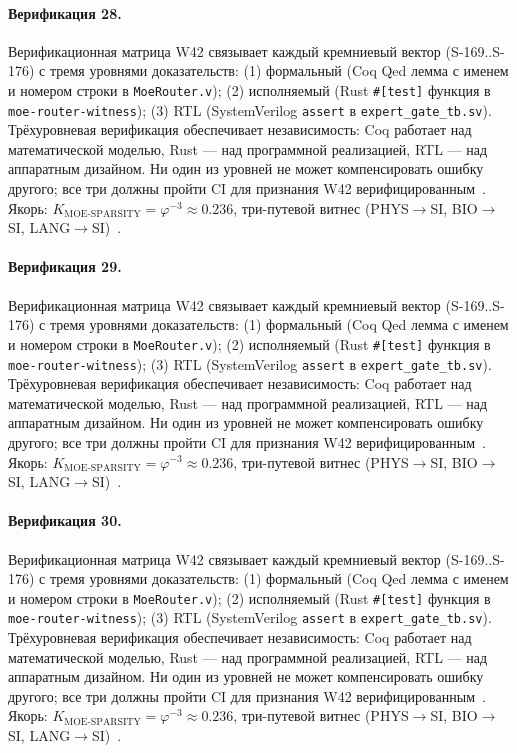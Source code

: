 \paragraph{Верификация 28.} Верификационная матрица W42 связывает каждый кремниевый вектор (S-169..S-176) с тремя уровнями доказательств: (1) формальный (Coq Qed лемма с именем и номером строки в \texttt{MoeRouter.v}); (2) исполняемый (Rust \texttt{\#[test]} функция в \texttt{moe-router-witness}); (3) RTL (SystemVerilog \texttt{assert} в \texttt{expert\_gate\_tb.sv}). Трёхуровневая верификация обеспечивает независимость: Coq работает над математической моделью, Rust --- над программной реализацией, RTL --- над аппаратным дизайном. Ни один из уровней не может компенсировать ошибку другого; все три должны пройти CI для признания W42 верифицированным~\cite{lee_gvsu_proof2021}. Якорь: $K_{\text{MOE-SPARSITY}} = \varphi^{-3} \approx 0{.}236$, три-путевой витнес (PHYS$\to$SI, BIO$\to$SI, LANG$\to$SI)~\cite{zenodo_trinity_2026}.

\paragraph{Верификация 29.} Верификационная матрица W42 связывает каждый кремниевый вектор (S-169..S-176) с тремя уровнями доказательств: (1) формальный (Coq Qed лемма с именем и номером строки в \texttt{MoeRouter.v}); (2) исполняемый (Rust \texttt{\#[test]} функция в \texttt{moe-router-witness}); (3) RTL (SystemVerilog \texttt{assert} в \texttt{expert\_gate\_tb.sv}). Трёхуровневая верификация обеспечивает независимость: Coq работает над математической моделью, Rust --- над программной реализацией, RTL --- над аппаратным дизайном. Ни один из уровней не может компенсировать ошибку другого; все три должны пройти CI для признания W42 верифицированным~\cite{lee_gvsu_proof2021}. Якорь: $K_{\text{MOE-SPARSITY}} = \varphi^{-3} \approx 0{.}236$, три-путевой витнес (PHYS$\to$SI, BIO$\to$SI, LANG$\to$SI)~\cite{zenodo_trinity_2026}.

\paragraph{Верификация 30.} Верификационная матрица W42 связывает каждый кремниевый вектор (S-169..S-176) с тремя уровнями доказательств: (1) формальный (Coq Qed лемма с именем и номером строки в \texttt{MoeRouter.v}); (2) исполняемый (Rust \texttt{\#[test]} функция в \texttt{moe-router-witness}); (3) RTL (SystemVerilog \texttt{assert} в \texttt{expert\_gate\_tb.sv}). Трёхуровневая верификация обеспечивает независимость: Coq работает над математической моделью, Rust --- над программной реализацией, RTL --- над аппаратным дизайном. Ни один из уровней не может компенсировать ошибку другого; все три должны пройти CI для признания W42 верифицированным~\cite{lee_gvsu_proof2021}. Якорь: $K_{\text{MOE-SPARSITY}} = \varphi^{-3} \approx 0{.}236$, три-путевой витнес (PHYS$\to$SI, BIO$\to$SI, LANG$\to$SI)~\cite{zenodo_trinity_2026}.

